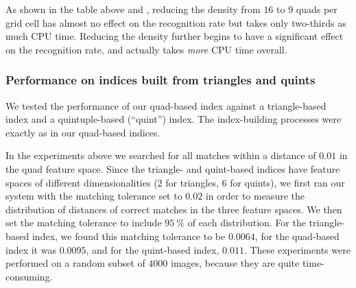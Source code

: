 As shown in the table above and , reducing the
density from $16$ to $9$ quads per \healpix grid cell has almost no
effect on the recognition rate but takes only two-thirds as much CPU
time.  Reducing the density further begins to have a significant
effect on the recognition rate, and actually takes \emph{more} CPU
time overall.


\subsubsection{Performance on indices built from triangles and quints}
\label{sec:triquint}



We tested the performance of our quad-based index against a
triangle-based index and a quintuple-based (``quint'') index.  The
index-building processes were exactly as in our quad-based indices.

In the experiments above we searched for all matches within a distance
of $0.01$ in the quad feature space.  Since the triangle- and
quint-based indices have feature spaces of different dimensionalities
($2$ for triangles, $6$ for quints), we first ran our system with the
matching tolerance set to $0.02$ in order to measure the distribution
of distances of correct matches in the three feature spaces.  We then
set the matching tolerance to include $95~\percent$ of each
distribution.  For the triangle-based index, we found this matching
tolerance to be $0.0064$, for the quad-based index it was $0.0095$,
and for the quint-based index, $0.011$.  These experiments were
performed on a random subset of $4000$ images, because they are quite
time-consuming.

\nonumberparagraphs
\begin{center}
\sdsstriquinttable
\end{center}
\numberparagraphs


